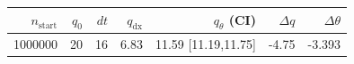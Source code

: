 \begin{tabular}{r r r r r r r}
\hline
$n_{\mathrm{start}}$ & $q_0$ & $dt$ & $q_{\mathrm{dx}}$ & $q_{\theta}$ (CI) & $\Delta q$ & $\Delta\theta$ \\
\hline
1000000 & 20 & 16 & 6.83 & 11.59 [11.19,11.75] & -4.75 & -3.393 \\
\hline
\end{tabular}
